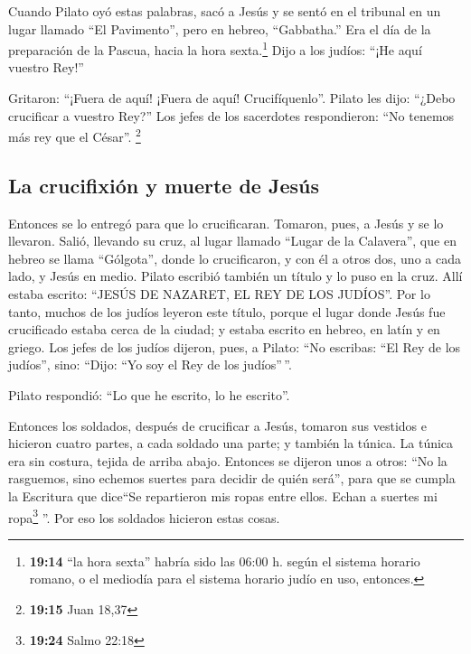 \begin{paracol}{2}
 Cuando Pilato oyó estas palabras, sacó a Jesús y se
sentó en el tribunal en un lugar llamado ``El Pavimento'', pero en
hebreo, ``Gabbatha.''  Era el día de la preparación de la
Pascua, hacia la hora sexta.\footnote{\textbf{19:14} ``la hora sexta''
  habría sido las 06:00 h. según el sistema horario romano, o el
  mediodía para el sistema horario judío en uso, entonces.} Dijo a los
judíos: ``¡He aquí vuestro Rey!''

 Gritaron: ``¡Fuera de aquí! ¡Fuera de aquí!
Crucifíquenlo''. Pilato les dijo: ``¿Debo crucificar a vuestro Rey?''
Los jefes de los sacerdotes respondieron: ``No tenemos más rey que el
César''. \footnote{\textbf{19:15} Juan 18,37}

\hypertarget{la-crucifixiuxf3n-y-muerte-de-jesuxfas}{%
\subsection{La crucifixión y muerte de
Jesús}\label{la-crucifixiuxf3n-y-muerte-de-jesuxfas}}

 Entonces se lo entregó para que lo crucificaran.
Tomaron, pues, a Jesús y se lo llevaron.  Salió, llevando
su cruz, al lugar llamado ``Lugar de la Calavera'', que en hebreo se
llama ``Gólgota'',  donde lo crucificaron, y con él a
otros dos, uno a cada lado, y Jesús en medio.  Pilato
escribió también un título y lo puso en la cruz. Allí estaba escrito:
``JESÚS DE NAZARET, EL REY DE LOS JUDÍOS''.  Por lo
tanto, muchos de los judíos leyeron este título, porque el lugar donde
Jesús fue crucificado estaba cerca de la ciudad; y estaba escrito en
hebreo, en latín y en griego.  Los jefes de los judíos
dijeron, pues, a Pilato: ``No escribas: ``El Rey de los judíos'', sino:
``Dijo: ``Yo soy el Rey de los judíos''\,''.

 Pilato respondió: ``Lo que he escrito, lo he escrito''.

 Entonces los soldados, después de crucificar a Jesús,
tomaron sus vestidos e hicieron cuatro partes, a cada soldado una parte;
y también la túnica. La túnica era sin costura, tejida de arriba abajo.
 Entonces se dijeron unos a otros: ``No la rasguemos,
sino echemos suertes para decidir de quién será'', para que se cumpla la
Escritura que dice``Se repartieron mis ropas entre ellos. Echan a
suertes mi ropa\footnote{\textbf{19:24} Salmo 22:18} ''. Por eso los
soldados hicieron estas cosas.


\end{paracol}
